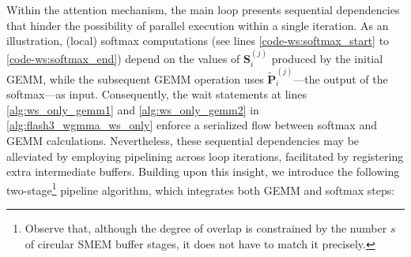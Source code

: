 \begin{enumerate}
Within the attention mechanism, the main loop presents sequential dependencies that hinder the possibility of parallel execution within a single iteration. As an illustration, (local) softmax computations (see lines \ref{code-ws:softmax_start} to \ref{code-ws:softmax_end}) depend on the values of $\mathbf{S}_i^{(j)}$ produced by the initial GEMM, while the subsequent GEMM operation uses $\widetilde{\mathbf{P}}_i^{(j)}$—the output of the softmax—as input. Consequently, the wait statements at lines \ref{alg:ws_only_gemm1} and \ref{alg:ws_only_gemm2} in \cref{alg:flash3_wgmma_ws_only} enforce a serialized flow between softmax and GEMM calculations. Nevertheless, these sequential dependencies may be alleviated by employing pipelining across loop iterations, facilitated by registering extra intermediate buffers. Building upon this insight, we introduce the following two-stage\footnote{Observe that, although the degree of overlap is constrained by the number $s$ of circular SMEM buffer stages, it does not have to match it precisely.} pipeline algorithm, which integrates both GEMM and softmax steps:


\end{enumerate}
